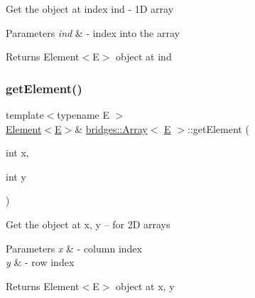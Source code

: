 Get the object at index ind -\/ 1D array


\begin{DoxyParams}{Parameters}
{\em ind} & -\/ index into the array\\
\hline
\end{DoxyParams}
\begin{DoxyReturn}{Returns}
Element$<$\+E$>$ object at \textquotesingle{}ind\textquotesingle{} 
\end{DoxyReturn}
\mbox{\label{classbridges_1_1_array_acd5e730e0369b1fa699a5907e889f213}} 
\subsubsection{\texorpdfstring{getElement()}{getElement()}\hspace{0.1cm}{\footnotesize\ttfamily [2/3]}}
{\footnotesize\ttfamily template$<$typename E $>$ \\
\mbox{\hyperlink{classbridges_1_1_element}{Element}}$<$\mbox{\hyperlink{namespacebridges_acfb0a4f7877d8f63de3e6862004c50eda3a3ea00cfc35332cedf6e5e9a32e94da}{E}}$>$\& \mbox{\hyperlink{classbridges_1_1_array}{bridges\+::\+Array}}$<$ \mbox{\hyperlink{namespacebridges_acfb0a4f7877d8f63de3e6862004c50eda3a3ea00cfc35332cedf6e5e9a32e94da}{E}} $>$\+::get\+Element (\begin{DoxyParamCaption}\item[{int}]{x,  }\item[{int}]{y }\end{DoxyParamCaption})\hspace{0.3cm}{\ttfamily [inline]}}

Get the object at x, y -- for 2D arrays


\begin{DoxyParams}{Parameters}
{\em x} & -\/ column index \\
\hline
{\em y} & -\/ row index\\
\hline
\end{DoxyParams}
\begin{DoxyReturn}{Returns}
Element$<$\+E$>$ object at x, y 
\end{DoxyReturn}
\mbox{\label{classbridges_1_1_array_a7006eeac547c391cb7e8eb19c56ae9f6}} 
